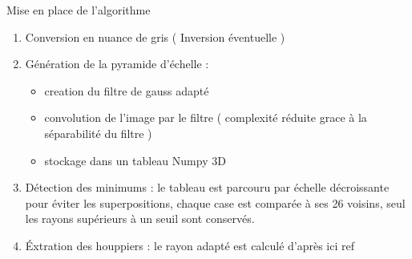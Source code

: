 \documentclass{beamer}
\begin{document}
\begin{frame}
	Mise en place de l'algorithme
	\begin{enumerate}
		\item Conversion en nuance de gris ( Inversion éventuelle ) 
		\item Génération de la pyramide d'échelle : 
		\begin{itemize}
			\item creation du filtre de gauss adapté
			\item convolution de l'image par le filtre ( complexité réduite grace à la séparabilité du filtre )
			\item stockage dans un tableau Numpy 3D
		\end{itemize}
		\item Détection des minimums : le tableau est parcouru par échelle décroissante pour éviter les superpositions, chaque case est comparée à ses 26 voisins, seul les rayons supérieurs à un seuil sont conservés.  
		\item \'{E}xtration des houppiers : le rayon adapté est calculé d'après ici ref 
	\end{enumerate}	
\end{frame}
\end{document}
